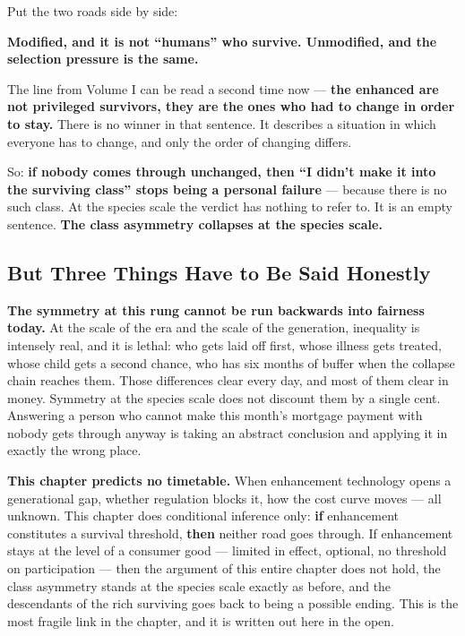 \documentclass[11pt,a4paper]{article}
\begin{document}
Put the two roads side by side:

\textbf{Modified, and it is not ``humans'' who survive. Unmodified, and the selection pressure is the same.}

The line from Volume I can be read a second time now --- \textbf{the enhanced are not privileged survivors, they are the ones who had to change in order to stay.} There is no winner in that sentence. It describes a situation in which everyone has to change, and only the order of changing differs.

So: \textbf{if nobody comes through unchanged, then ``I didn't make it into the surviving class'' stops being a personal failure} --- because there is no such class. At the species scale the verdict has nothing to refer to. It is an empty sentence. \textbf{The class asymmetry collapses at the species scale.}

\subsection{But Three Things Have to Be Said Honestly}

\textbf{The symmetry at this rung cannot be run backwards into fairness today.} At the scale of the era and the scale of the generation, inequality is intensely real, and it is lethal: who gets laid off first, whose illness gets treated, whose child gets a second chance, who has six months of buffer when the collapse chain reaches them. Those differences clear every day, and most of them clear in money. Symmetry at the species scale does not discount them by a single cent. Answering a person who cannot make this month's mortgage payment with nobody gets through anyway is taking an abstract conclusion and applying it in exactly the wrong place.

\textbf{This chapter predicts no timetable.} When enhancement technology opens a generational gap, whether regulation blocks it, how the cost curve moves --- all unknown. This chapter does conditional inference only: \textbf{if} enhancement constitutes a survival threshold, \textbf{then} neither road goes through. If enhancement stays at the level of a consumer good --- limited in effect, optional, no threshold on participation --- then the argument of this entire chapter does not hold, the class asymmetry stands at the species scale exactly as before, and the descendants of the rich surviving goes back to being a possible ending. This is the most fragile link in the chapter, and it is written out here in the open.
\end{document}
